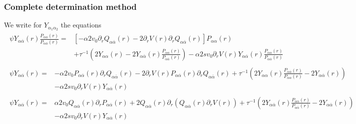 \documentclass[pre,aps,superscriptaddress,nofootinbib]{revtex4}
\begin{document}
\subsubsection{Complete determination method}

We write for $Y_{\alpha_1\alpha_2}$ the equations
\begin{eqnarray}
\label{FPrY1}
\begin{aligned}
\psi Y_{\alpha\overline{\alpha}}(r) \frac{P_{\alpha\alpha}(r)}{P_{\alpha\overline{\alpha}}(r)} = &\left[- \alpha 2 v_0 \partial_r Q_{\alpha\overline{\alpha}}(r) - 2 \partial_r V(r) \partial_r Q_{\alpha\overline{\alpha}}(r)\right] P_{\alpha\alpha}(r)\\
&+ \tau^{-1} \left(2 Y_{\alpha\alpha}(r) - 2 Y_{\alpha\overline{\alpha}}(r) \frac{P_{\alpha\alpha}(r)}{P_{\alpha\overline{\alpha}}(r)}\right) - \alpha 2 s v_0 \partial_r V(r) Y_{\alpha\overline{\alpha}}(r) \frac{P_{\alpha\alpha}(r)}{P_{\alpha\overline{\alpha}}(r)}
\end{aligned}\\
\label{FPrY3}
\begin{aligned}
\psi Y_{\alpha\overline{\alpha}}(r) = &- \alpha 2 v_0 P_{\alpha\overline{\alpha}}(r) \partial_r Q_{\alpha\overline{\alpha}}(r) - 2 \partial_r V(r) P_{\alpha\overline{\alpha}}(r) \partial_r Q_{\alpha\overline{\alpha}}(r) + \tau^{-1} \left(2 Y_{\alpha\alpha}(r) \frac{P_{\alpha\overline{\alpha}}(r)}{P_{\alpha\alpha}(r)} - 2 Y_{\alpha\overline{\alpha}}(r)\right)\\
&- \alpha 2 s v_0 \partial_r V(r) Y_{\alpha\overline{\alpha}}(r)
\end{aligned}\\
\label{FPrY4}
\begin{aligned}
\psi Y_{\alpha\overline{\alpha}}(r) = &\alpha 2 v_0 Q_{\alpha\overline{\alpha}}(r) \partial_r P_{\alpha\overline{\alpha}}(r) + 2 Q_{\alpha\overline{\alpha}}(r) \partial_r (Q_{\alpha\overline{\alpha}}(r) \partial_r V(r)) + \tau^{-1} \left(2 Y_{\alpha\overline{\alpha}}(r) \frac{P_{\alpha\alpha}(r)}{P_{\alpha\overline{\alpha}}(r)} - 2 Y_{\alpha\overline{\alpha}}(r)\right)\\
&- \alpha 2 s v_0 \partial_r V(r) Y_{\alpha\overline{\alpha}}(r)
\end{aligned}
\end{eqnarray}
\end{document}
